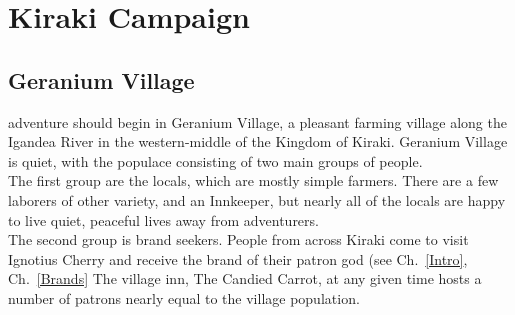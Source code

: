\part{Kiraki Campaign}

\chapter{Geranium Village}\label{Geranium}

 adventure should begin in Geranium Village, a pleasant farming village along the Igandea River in the western-middle of the Kingdom of Kiraki. Geranium Village is quiet, with the populace consisting of two main groups of people.\\

The first group are the locals, which are mostly simple farmers. There are a few laborers of other variety, and an Innkeeper, but nearly all of the locals are happy to live quiet, peaceful lives away from adventurers.\\ 
The second group is brand seekers. People from across Kiraki come to visit Ignotius Cherry and receive the brand of their patron god (see Ch.~\ref{Intro}, Ch.~\ref{Brands} The village inn, The Candied Carrot, at any given time hosts a number of patrons nearly equal to the village population.